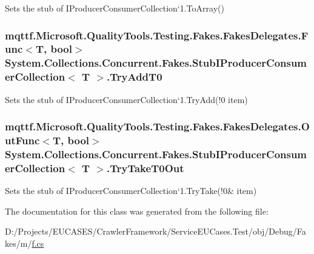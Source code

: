 Sets the stub of I\-Producer\-Consumer\-Collection`1.To\-Array()

\hypertarget{class_system_1_1_collections_1_1_concurrent_1_1_fakes_1_1_stub_i_producer_consumer_collection_3_01_t_01_4_a8a1097c9f7e3581c8aa5896f1223296e}{
\subsubsection[{Try\-Add\-T0}]{\setlength{\rightskip}{0pt plus 5cm}mqttf.\-Microsoft.\-Quality\-Tools.\-Testing.\-Fakes.\-Fakes\-Delegates.\-Func$<$T, bool$>$ System.\-Collections.\-Concurrent.\-Fakes.\-Stub\-I\-Producer\-Consumer\-Collection$<$ T $>$.Try\-Add\-T0}}\label{class_system_1_1_collections_1_1_concurrent_1_1_fakes_1_1_stub_i_producer_consumer_collection_3_01_t_01_4_a8a1097c9f7e3581c8aa5896f1223296e}


Sets the stub of I\-Producer\-Consumer\-Collection`1.Try\-Add(!0 item)

\hypertarget{class_system_1_1_collections_1_1_concurrent_1_1_fakes_1_1_stub_i_producer_consumer_collection_3_01_t_01_4_a6026956ccea4b389375ab14bb7df4b9d}{
\subsubsection[{Try\-Take\-T0\-Out}]{\setlength{\rightskip}{0pt plus 5cm}mqttf.\-Microsoft.\-Quality\-Tools.\-Testing.\-Fakes.\-Fakes\-Delegates.\-Out\-Func$<$T, bool$>$ System.\-Collections.\-Concurrent.\-Fakes.\-Stub\-I\-Producer\-Consumer\-Collection$<$ T $>$.Try\-Take\-T0\-Out}}\label{class_system_1_1_collections_1_1_concurrent_1_1_fakes_1_1_stub_i_producer_consumer_collection_3_01_t_01_4_a6026956ccea4b389375ab14bb7df4b9d}


Sets the stub of I\-Producer\-Consumer\-Collection`1.Try\-Take(!0\& item)



The documentation for this class was generated from the following file\-:\begin{DoxyCompactItemize}
\item 
D\-:/\-Projects/\-E\-U\-C\-A\-S\-E\-S/\-Crawler\-Framework/\-Service\-E\-U\-Cases.\-Test/obj/\-Debug/\-Fakes/m/\hyperlink{m_2f_8cs}{f.\-cs}\end{DoxyCompactItemize}

